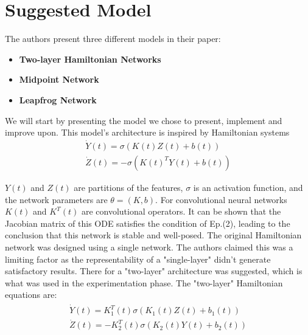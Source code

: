 \documentclass{article}
\theoremstyle{remark}
\begin{document}
\pagebreak

\section*{Suggested Model}
    The authors present three different models in their paper:
    \begin{itemize}
        \item \textbf{Two-layer Hamiltonian Networks}
        \item \textbf{Midpoint Network}
        \item \textbf{Leapfrog Network}
    \end{itemize} \par 
    We will start by presenting the model we chose to present, implement and improve upon. This model's architecture is inspired by Hamiltonian systems
    \begin{gather*}
        \dot{Y}(t) = \sigma (K(t)Z(t) + b(t)) \\
        \dot{Z}(t) = -\sigma (K(t)^T Y(t) + b(t))
    \end{gather*}
    \par 
    $Y(t)$ and $Z(t)$ are partitions of the features, $\sigma$ is an activation function, and the network parameters are $\theta = (K,b)$. For convolutional neural networks $K(t)$ and $K^T(t)$ 
are convolutional operators. It can be shown that the Jacobian matrix of this ODE satisfies the condition of Ep.(2), leading to the conclusion that this network is stable and well-posed. 
The original Hamiltonian network \cite{Haber and Ruthotto} was designed using a single network. The authors claimed this was a limiting factor as the representability of a "single-layer" 
didn't generate satisfactory results. There for a "two-layer" architecture was suggested, which is what was used in the experimentation phase. The "two-layer" Hamiltonian equations are:
\begin{gather}
    \begin{split}
        \dot{Y}(t) = K^T_1(t) \sigma (K_1(t)Z(t) + b_1(t)) \\
        \dot{Z}(t) = -K^T_2(t) \sigma (K_2(t)Y(t) + b_2(t))
    \end{split}
\end{gather}
\end{document}
